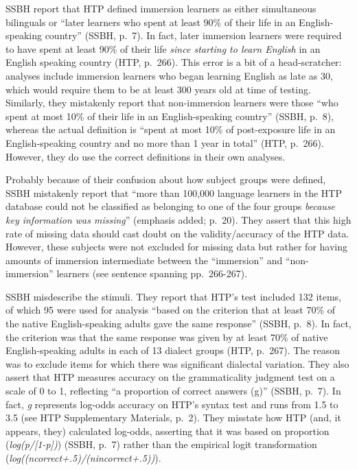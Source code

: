 \documentclass[
  english,
  doc,floatsintext]{apa6}
\begin{document}
\begin{appendix}
SSBH report that HTP defined immersion learners as either simultaneous
bilinguals or ``later learners who spent at least 90\% of their life in
an English-speaking country'' (SSBH, p.~7). In fact, later immersion
learners were required to have spent at least 90\% of their life
\emph{since starting to learn English} in an English speaking country
(HTP, p.~266). This error is a bit of a head-scratcher: analyses include
immersion learners who began learning English as late as 30, which would
require them to be at least 300 years old at time of testing. Similarly,
they mistakenly report that non-immersion learners were those ``who
spent at most 10\% of their life in an English-speaking country'' (SSBH,
p.~8), whereas the actual definition is ``spent at most 10\% of
post-exposure life in an English-speaking country and no more than 1
year in total'' (HTP, p.~266). However, they do use the correct
definitions in their own analyses.

Probably because of their confusion about how subject groups were
defined, SSBH mistakenly report that ``more than 100,000 language
learners in the HTP database could not be classified as belonging to one
of the four groups \emph{because key information was missing}''
(emphasis added; p.~20). They assert that this high rate of missing data
should cast doubt on the validity/accuracy of the HTP data. However,
these subjects were not excluded for missing data but rather for having
amounts of immersion intermediate between the ``immersion'' and
``non-immersion'' learners (see sentence spanning pp.~266-267).

SSBH misdescribe the stimuli. They report that HTP's test included 132
items, of which 95 were used for analysis ``based on the criterion that
at least 70\% of the native English-speaking adults gave the same
response'' (SSBH, p.~8). In fact, the criterion was that the same
response was given by at least 70\% of native English-speaking adults in
each of 13 dialect groups (HTP, p.~267). The reason was to exclude items
for which there was significant dialectal variation. They also assert
that HTP measures accuracy on the grammaticality judgment test on a
scale of 0 to 1, reflecting ``a proportion of correct answers (g)''
(SSBH, p.~7). In fact, \emph{g} represents log-odds accuracy on HTP's
syntax test and runs from 1.5 to 3.5 (see HTP Supplementary Materials,
p.~2). They misstate how HTP (and, it appears, they) calculated
log-odds, asserting that it was based on proportion
(\emph{log(p/{[}1-p{]})}) (SSBH, p.~7) rather than the empirical logit
transformation (\emph{log((ncorrect+.5)/(nincorrect+.5))}).


\end{appendix}
\end{document}
